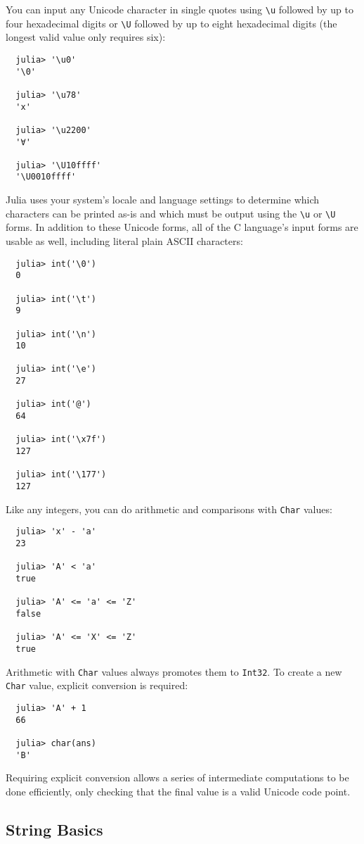\documentclass{article}
\begin{document}
You can input any Unicode character in single quotes using \verb|\u| followed by up to four hexadecimal digits or \verb|\U| followed by up to eight hexadecimal digits (the longest valid value only requires six):
\begin{verbatim}
  julia> '\u0'
  '\0'

  julia> '\u78'
  'x'

  julia> '\u2200'
  '∀'

  julia> '\U10ffff'
  '\U0010ffff'
\end{verbatim}
Julia uses your system's locale and language settings to determine which characters can be printed as-is and which must be output using the \verb|\u| or \verb|\U| forms.
In addition to these Unicode forms, all of the C language's input forms are usable as well, including literal plain ASCII characters:
\begin{verbatim}
  julia> int('\0')
  0

  julia> int('\t')
  9

  julia> int('\n')
  10

  julia> int('\e')
  27

  julia> int('@')
  64

  julia> int('\x7f')
  127

  julia> int('\177')
  127
\end{verbatim}
Like any integers, you can do arithmetic and comparisons with \verb|Char| values:
\begin{verbatim}
  julia> 'x' - 'a'
  23

  julia> 'A' < 'a'
  true

  julia> 'A' <= 'a' <= 'Z'
  false

  julia> 'A' <= 'X' <= 'Z'
  true
\end{verbatim}
Arithmetic with \verb|Char| values always promotes them to \verb|Int32|.
To create a new \verb|Char| value, explicit conversion is required:
\begin{verbatim}
  julia> 'A' + 1
  66

  julia> char(ans)
  'B'
\end{verbatim}
Requiring explicit conversion allows a series of intermediate computations to be done efficiently, only checking that the final value is a valid Unicode code point.

\subsection{String Basics}
\end{document}
